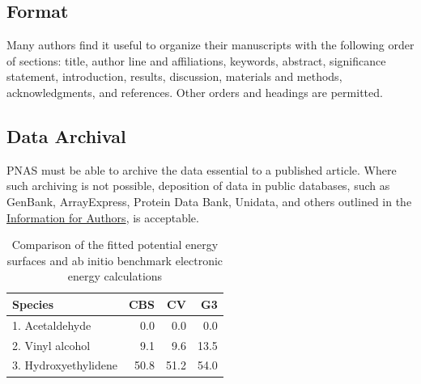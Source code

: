 \documentclass[9pt,twocolumn,twoside]{pnas-new}
\begin{document}
\subsection*{Format}

Many authors find it useful to organize their manuscripts with the following order of sections: title, author line and affiliations, keywords, abstract, significance statement, introduction, results, discussion, materials and methods, acknowledgments, and references. Other orders and headings are permitted.





\subsection*{Data Archival}

PNAS must be able to archive the data essential to a published article. Where such archiving is not possible, deposition of data in public databases, such as GenBank, ArrayExpress, Protein Data Bank, Unidata, and others outlined in the \href{https://www.pnas.org/author-center/editorial-and-journal-policies#materials-and-data-availability}{Information for Authors}, is acceptable.



\begin{table}[t!]
\centering
\caption{Comparison of the fitted potential energy surfaces and ab initio benchmark electronic energy calculations}
\begin{tabular}{lrrr}
Species & CBS & CV & G3 \\
\midrule
1. Acetaldehyde & 0.0 & 0.0 & 0.0 \\
2. Vinyl alcohol & 9.1 & 9.6 & 13.5 \\
3. Hydroxyethylidene & 50.8 & 51.2 & 54.0\\
\bottomrule
\end{tabular}

\end{table}
\end{document}
